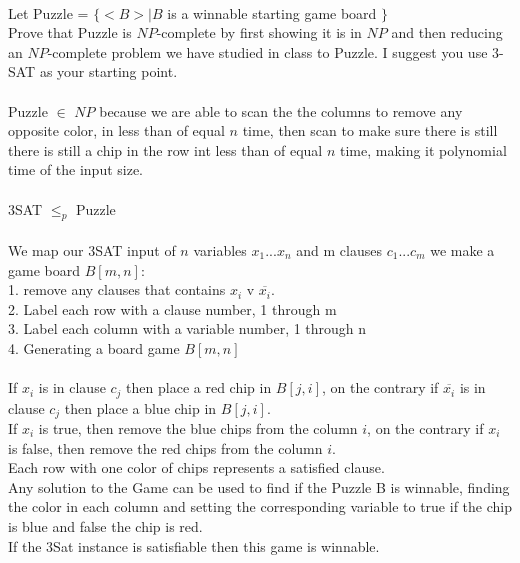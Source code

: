 \documentclass[11pt, oneside]{article}   	%
\begin{document}
\\Let Puzzle = $\{ < B > | B$ is a winnable starting game board $\}$
\\Prove that Puzzle is $NP$-complete by first showing it is in $NP$ and then reducing an $NP$-complete problem we have studied in class to Puzzle. I suggest you use $3$-SAT as your starting point.
\\
\\Puzzle $\in$ $NP$ because we are able to scan the the columns to remove any opposite color, in less than of equal $n$ time, then scan to make sure there is still there is still a chip in the row int less than of equal $n$ time, making it polynomial time of the input size.
\\
\\3SAT $\le_p$ Puzzle
\\
\\We map our 3SAT input of $n$ variables $x_1 ... x_n$ and m clauses $c_1 ... c_m$ we make a game board $B[m,n]$:
\\1. remove any clauses that contains $x_i$ v $\overline{x_i}$.
\\2. Label each row with a clause number, 1 through m
\\3. Label each column with a variable number, 1 through n
\\4. Generating a board game $B[m,n]$
\\
\\If $x_i$ is in clause $c_j$ then place a red chip in $B[j,i]$, on the contrary if $\overline{x_i}$ is in clause $c_j$ then place a blue chip in $B[j,i]$. 
\\If $x_i$ is true, then remove the blue chips from the column $i$, on the contrary if $x_i$ is false, then remove the red chips from the column $i$. 
\\Each row with one color of chips represents a satisfied clause. 
\\Any solution to the Game can be used to find if the Puzzle B is winnable, finding the color in each column and setting the corresponding variable to true if the chip is blue and false the chip is red.
\\If the 3Sat instance is satisfiable then this game is winnable. 
\\
\end{document}
